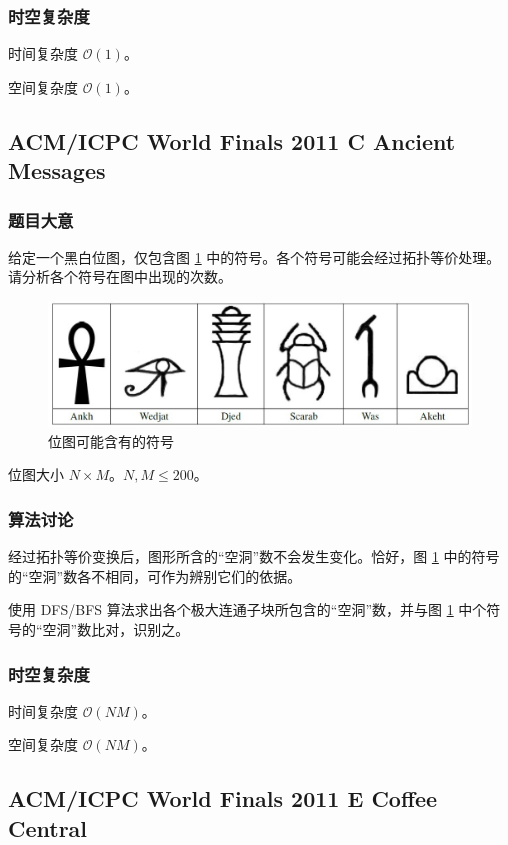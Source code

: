 			\subsubsection{时空复杂度}
				时间复杂度 $\mathcal{O}\left(1\right)$。
					
				空间复杂度 $\mathcal{O}\left(1\right)$。
		\newpage
		\subsection{ACM/ICPC World Finals 2011 C Ancient Messages}
			\subsubsection{题目大意}
				给定一个黑白位图，仅包含图
				\ref{11c} 中的符号。各个符号可能会经过拓扑等价处理。请分析各个符号在图中出现的次数。
				\begin{figure}[!htb]
 					\centering
					\includegraphics[width=0.8 \textwidth]{6.jpg}
					\caption{位图可能含有的符号}\label{11c}
				
				\end{figure}
				
				位图大小 $N \times M$。$N,M \le 200$。
			\subsubsection{算法讨论}
				经过拓扑等价变换后，图形所含的“空洞”数不会发生变化。恰好，图 \ref{11c} 中的符号的“空洞”数各不相同，可作为辨别它们的依据。
				
				使用 DFS/BFS 算法求出各个极大连通子块所包含的“空洞”数，并与图 \ref{11c} 中个符号的“空洞”数比对，识别之。
			\subsubsection{时空复杂度}
				时间复杂度 $\mathcal{O}\left(NM\right)$。
					
				空间复杂度 $\mathcal{O}\left(NM\right)$。
		\newpage
		\subsection{ACM/ICPC World Finals 2011 E Coffee Central}
